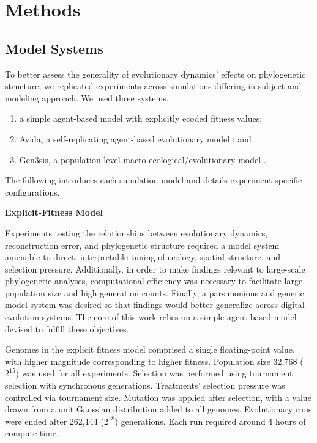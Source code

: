 \section{Methods}
\label{sec:methods}

\subsection{Model Systems}

To better assess the generality of evolutionary dynamics' effects on phylogenetic structure, we replicated experiments across simulations differing in subject and modeling approach.
We used three systems,
\begin{enumerate}
\item a simple agent-based model with explicitly ecoded fitness values;
\item Avida, a self-replicating agent-based evolutionary model \citep{ofria2004avida}; and
\item Gen3sis, a population-level macro-ecological/evolutionary model \citep{hagen2021gen3sis}.
\end{enumerate}

The following introduces each simulation model and details experiment-specific configurations.

\textbf{Explicit-Fitness Model}

Experiments testing the relationships between evolutionary dynamics, reconstruction error, and phylogenetic structure required a model system amenable to direct, interpretable tuning of ecology, spatial structure, and selection pressure.
Additionally, in order to make findings relevant to large-scale phylogenetic analyses, computational efficiency was necessary to facilitate large population size and high generation counts.
Finally, a parsimonious and generic model system was desired so that findings would better generalize across digital evolution systems.
The core of this work relies on a simple agent-based model  devised to fulfill these objectives.

Genomes in the explicit fitness model comprised a single floating-point value, with higher magnitude corresponding to higher fitness.
Population size 32,768 ($2^{15}$) was used for all experiments.
Selection was performed using tournament selection with synchronous generations.
Treatments' selection pressure was controlled via tournament size.
Mutation was applied after selection, with a value drawn from a unit Gaussian distribution added to all genomes.
Evolutionary runs were ended after 262,144 ($2^{18}$) generations.
Each run required around 4 hours of compute time.

